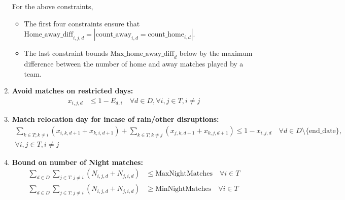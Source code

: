 \documentclass[a4paper, 12pt]{article}
\begin{document}
\begin{enumerate}
    For the above constraints,
    \begin{itemize}
        \item The first four constraints ensure that $\text{Home\_away\_diff}_{i,j,d} = |\text{count\_away}_{i,d} = \text{count\_home}_{i,d}|$.
        \item The last constraint bounds $\text{Max\_home\_away\_diff}_{d}$ below by the maximum difference between the number of home and away matches played by a team.
    \end{itemize}
    \item \textbf{Avoid matches on restricted days:}
    \begin{align*}
        x_{i,j,d} &\leq 1 - E_{d,i} \quad \forall d \in D, \forall i,j \in T, i \neq j
    \end{align*}

    \item \textbf{Match relocation day for incase of rain/other disruptions:}
    \begin{align*}
         \sum_{k \in T; k \neq i} (x_{i,k,d+1} + x_{k,i,d+1}) + \sum_{k \in T; k \neq j} (x_{j,k,d+1} + x_{k,j,d+1}) \leq 1 - x_{i,j,d} \quad \forall d \in D \setminus \{ \text{end\_date} \}, \\
         \forall i,j \in T, i \neq j
    \end{align*}

    \item \textbf{Bound on number of Night matches:}
    \begin{align*}
        \sum_{d \in D} \sum_{j \in T : j \neq i} (N_{i,j,d} + N_{j,i,d}) &\leq \text{MaxNightMatches} \quad \forall i \in T\\
        \sum_{d \in D} \sum_{j \in T : j \neq i} (N_{i,j,d} + N_{j,i,d}) &\geq \text{MinNightMatches} \quad \forall i \in T
    \end{align*}


\end{enumerate}
\end{document}
